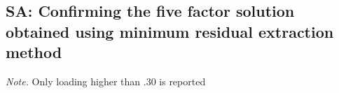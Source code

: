\documentclass[
  english,
  man]{apa6}
\begin{document}
\begin{appendix}
\hypertarget{sa-confirming-the-five-factor-solution-obtained-using-minimum-residual-extraction-method}{%
\section{SA: Confirming the five factor solution obtained using minimum
residual extraction
method}\label{sa-confirming-the-five-factor-solution-obtained-using-minimum-residual-extraction-method}}

\begin{center}
\begin{ThreePartTable}

\begin{TableNotes}[para]
\normalsize{\textit{Note.} Only loading higher than .30 is reported}
\end{TableNotes}


\end{ThreePartTable}
\end{center}
\end{appendix}
\end{document}
